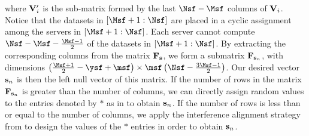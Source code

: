 \documentclass[conference,letterpaper]{IEEEtran}
\begin{document}
where ${\bf V}'_i$ is the sub-matrix formed by the last $\Nsf - \Msf$ columns of ${\bf V}_i$.
Notice that the datasets in $[\Msf+1 : \Nsf]$ are placed in a cyclic assignment among the servers in $[\Msf+1 : \Nsf]$. Each server cannot compute $\Nsf - \Msf - \frac{\Msf - 1}{2}$ of the datasets in $[\Msf+1 : \Nsf]$. By extracting the corresponding columns from the matrix ${\bf F}_{\bf s}$, we form a submatrix ${\bf F}_{{\bf s}_n}$, with dimensions 
$\left(\frac{\Msf + 1}{2} - \ysf + \msf\right) \times \msf \left(\Nsf - \frac{3\Msf - 1}{2}\right)$.
Our desired vector ${\bf s}_n$ is then the left null vector of this matrix.
If the number of rows in the matrix ${\bf F}_{{\bf s}_n}$ is greater than the number of columns, we can directly assign random values to the entries denoted by $*$ as in \cite{wan2022secure} to obtain ${\bf s}_n$. If the number of rows is less than or equal to the number of columns, we apply the interference alignment strategy from \cite{limit} to design the values of the $*$ entries in order to obtain ${\bf s}_n$.
\end{document}
